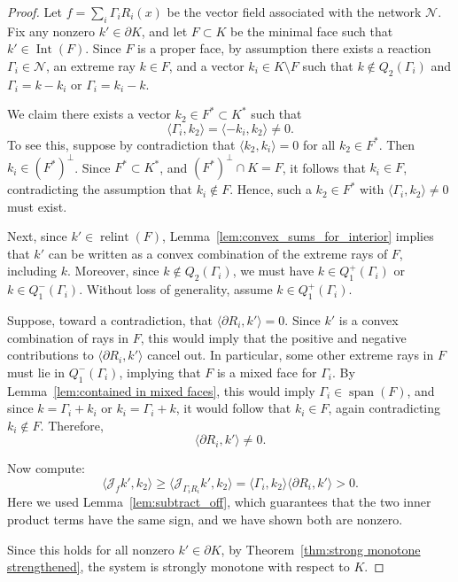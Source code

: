 \documentclass{article}
\begin{document}
\begin{proof}
Let \( f = \sum_i \Gamma_i R_i(x) \) be the vector field associated with the network \( \mathcal{N} \). Fix any nonzero \( k' \in \partial K \), and let \( F \subset K \) be the minimal face such that \( k' \in \operatorname{Int}(F) \). Since \( F \) is a proper face, by assumption there exists a reaction \( \Gamma_i \in \mathcal{N} \), an extreme ray \( k \in F \), and a vector \( k_i \in K \setminus F \) such that \( k \notin Q_2(\Gamma_i) \) and \( \Gamma_i = k - k_i \) or \( \Gamma_i = k_i - k \).

We claim there exists a vector \( k_2 \in F^* \subset K^* \) such that
\[
\langle \Gamma_i, k_2 \rangle = \langle -k_i, k_2 \rangle \neq 0.
\]
To see this, suppose by contradiction that \( \langle k_2, k_i \rangle = 0 \) for all \( k_2 \in F^* \). Then \( k_i \in (F^*)^\perp \). Since \( F^* \subset K^* \), and \( (F^*)^\perp \cap K = F \), it follows that \( k_i \in F \), contradicting the assumption that \( k_i \notin F \). Hence, such a \( k_2 \in F^* \) with \( \langle \Gamma_i, k_2 \rangle \neq 0 \) must exist.

Next, since \( k' \in \operatorname{relint}(F) \), Lemma~\ref{lem:convex_sums_for_interior} implies that \( k' \) can be written as a convex combination of the extreme rays of \( F \), including \( k \). Moreover, since \( k \notin Q_2(\Gamma_i) \), we must have \( k \in Q_1^+(\Gamma_i) \) or \( k \in Q_1^-(\Gamma_i) \). Without loss of generality, assume \( k \in Q_1^+(\Gamma_i) \).

Suppose, toward a contradiction, that \( \langle \partial R_i, k' \rangle = 0 \). Since \( k' \) is a convex combination of rays in \( F \), this would imply that the positive and negative contributions to \( \langle \partial R_i, k' \rangle \) cancel out. In particular, some other extreme rays in \( F \) must lie in \( Q_1^-(\Gamma_i) \), implying that \( F \) is a mixed face for \( \Gamma_i \). By Lemma~\ref{lem:contained in mixed faces}, this would imply \( \Gamma_i \in \operatorname{span}(F) \), and since \( k = \Gamma_i + k_i \) or \( k_i = \Gamma_i + k \), it would follow that \( k_i \in F \), again contradicting \( k_i \notin F \). Therefore,
\[
\langle \partial R_i, k' \rangle \neq 0.
\]

Now compute:
\[
\langle \mathcal{J}_f k', k_2 \rangle \geq \langle \mathcal{J}_{\Gamma_i R_i} k', k_2 \rangle = \langle \Gamma_i, k_2 \rangle \langle \partial R_i, k' \rangle > 0.
\]
Here we used Lemma~\ref{lem:subtract_off}, which guarantees that the two inner product terms have the same sign, and we have shown both are nonzero.

Since this holds for all nonzero \( k' \in \partial K \), by Theorem~\ref{thm:strong monotone strengthened}, the system is strongly monotone with respect to \( K \).
\end{proof}
\end{document}
